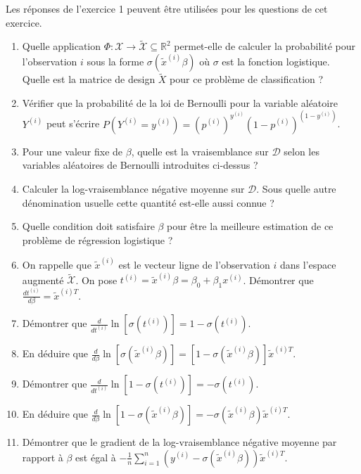 \documentclass[solutions]{../exercices}
\begin{document}
\begin{exercice}
Les réponses de l'exercice 1 peuvent être utilisées pour les questions de cet exercice.

\begin{enumerate}
	\item Quelle application $\Phi: \mathcal{X} \to \tilde{\mathcal{X}} \subseteq \mathbb{R}^2$ permet-elle de calculer la probabilité pour l'observation $i$ sous la forme $\sigma(\tilde{x}^{(i)} \beta)$ où $\sigma$ est la fonction logistique. Quelle est la matrice de design $\tilde{X}$ pour ce problème de classification ?
	\item Vérifier que la probabilité de la loi de Bernoulli pour la variable aléatoire $Y^{(i)}$ peut s'écrire $P(Y^{(i)} = y^{(i)}) = \left( p^{(i)} \right)^{y^{(i)}} \left(1 - p^{(i)}\right)^{\left(1 - y^{(i)}\right)}$.
	\item Pour une valeur fixe de $\beta$, quelle est la vraisemblance sur $\mathcal{D}$ selon les variables aléatoires de Bernoulli introduites ci-dessus ?
	\item Calculer la log-vraisemblance négative moyenne sur $\mathcal{D}$. Sous quelle autre dénomination usuelle cette quantité est-elle aussi connue ?
	\item Quelle condition doit satisfaire $\beta$ pour être la meilleure estimation de ce problème de régression logistique ?
	\item On rappelle que $\tilde{x}^{(i)}$ est le vecteur ligne de l'observation $i$ dans l'espace augmenté $\tilde{\mathcal{X}}$. On pose ${t^{(i)} = \tilde{x}^{(i)} \beta = \beta_0 + \beta_1 x^{(i)}}$. Démontrer que $\displaystyle \frac{d t^{(i)}}{d\beta} = \tilde{x}^{(i)T}$.
	\item Démontrer que $\displaystyle \frac{d}{d t^{(i)}}  \ln{\left[\sigma\left(t^{(i)}\right)\right]} = 1 - \sigma\left(t^{(i)}\right)$. 
	\item En déduire que $\displaystyle \frac{d}{d \beta}  \ln{\left[\sigma\left(\tilde{x}^{(i)} \beta\right)\right]} = \left[1 - \sigma\left(\tilde{x}^{(i)} \beta\right) \right] \tilde{x}^{(i)T}$.
	\item Démontrer que $\displaystyle \frac{d}{d t^{(i)}}  \ln{\left[1 - \sigma\left(t^{(i)}\right)\right]} = - \sigma\left(t^{(i)}\right)$.
	\item En déduire que $\displaystyle \frac{d}{d \beta}  \ln{\left[1 - \sigma\left(\tilde{x}^{(i)} \beta\right)\right]} = - \sigma\left(\tilde{x}^{(i)} \beta\right) \tilde{x}^{(i)T}$.
	\item Démontrer que le gradient de la log-vraisemblance négative moyenne par rapport à $\beta$ est égal à $\displaystyle -\frac{1}{n} \sum_{i=1}^n \left( y^{(i)} - \sigma(\tilde{x}^{(i)} \beta)\right) \tilde{x}^{(i)T}$.

\end{enumerate}
\end{exercice}
\end{document}
